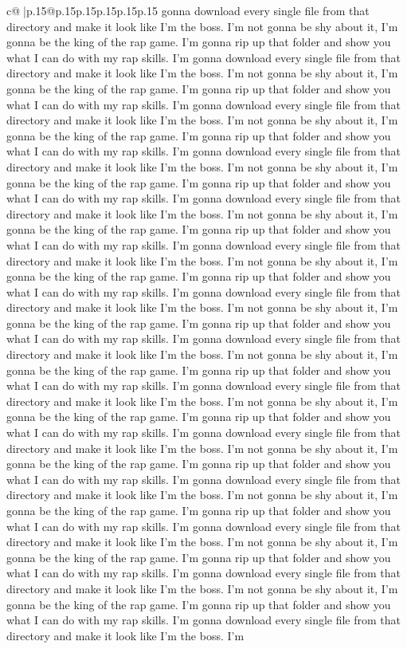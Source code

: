 \documentclass{article}
\begin{document}
{\begin{supertabular}{c@{$\;$}|p{.15\linewidth}@{}p{.15\linewidth}p{.15\linewidth}p{.15\linewidth}p{.15\linewidth}p{.15\linewidth}}
{{{gonna download every single file from that directory and make it look like I'm the boss. I'm not gonna be shy about it, I'm gonna be the king of the rap game. I'm gonna rip up that folder and show you what I can do with my rap skills. I'm gonna download every single file from that directory and make it look like I'm the boss. I'm not gonna be shy about it, I'm gonna be the king of the rap game. I'm gonna rip up that folder and show you what I can do with my rap skills. I'm gonna download every single file from that directory and make it look like I'm the boss. I'm not gonna be shy about it, I'm gonna be the king of the rap game. I'm gonna rip up that folder and show you what I can do with my rap skills. I'm gonna download every single file from that directory and make it look like I'm the boss. I'm not gonna be shy about it, I'm gonna be the king of the rap game. I'm gonna rip up that folder and show you what I can do with my rap skills. I'm gonna download every single file from that directory and make it look like I'm the boss. I'm not gonna be shy about it, I'm gonna be the king of the rap game. I'm gonna rip up that folder and show you what I can do with my rap skills. I'm gonna download every single file from that directory and make it look like I'm the boss. I'm not gonna be shy about it, I'm gonna be the king of the rap game. I'm gonna rip up that folder and show you what I can do with my rap skills. I'm gonna download every single file from that directory and make it look like I'm the boss. I'm not gonna be shy about it, I'm gonna be the king of the rap game. I'm gonna rip up that folder and show you what I can do with my rap skills. I'm gonna download every single file from that directory and make it look like I'm the boss. I'm not gonna be shy about it, I'm gonna be the king of the rap game. I'm gonna rip up that folder and show you what I can do with my rap skills. I'm gonna download every single file from that directory and make it look like I'm the boss. I'm not gonna be shy about it, I'm gonna be the king of the rap game. I'm gonna rip up that folder and show you what I can do with my rap skills. I'm gonna download every single file from that directory and make it look like I'm the boss. I'm not gonna be shy about it, I'm gonna be the king of the rap game. I'm gonna rip up that folder and show you what I can do with my rap skills. I'm gonna download every single file from that directory and make it look like I'm the boss. I'm not gonna be shy about it, I'm gonna be the king of the rap game. I'm gonna rip up that folder and show you what I can do with my rap skills. I'm gonna download every single file from that directory and make it look like I'm the boss. I'm not gonna be shy about it, I'm gonna be the king of the rap game. I'm gonna rip up that folder and show you what I can do with my rap skills. I'm gonna download every single file from that directory and make it look like I'm the boss. I'm not gonna be shy about it, I'm gonna be the king of the rap game. I'm gonna rip up that folder and show you what I can do with my rap skills. I'm gonna download every single file from that directory and make it look like I'm the boss. I'm }}}
\end{supertabular}}
\end{document}

